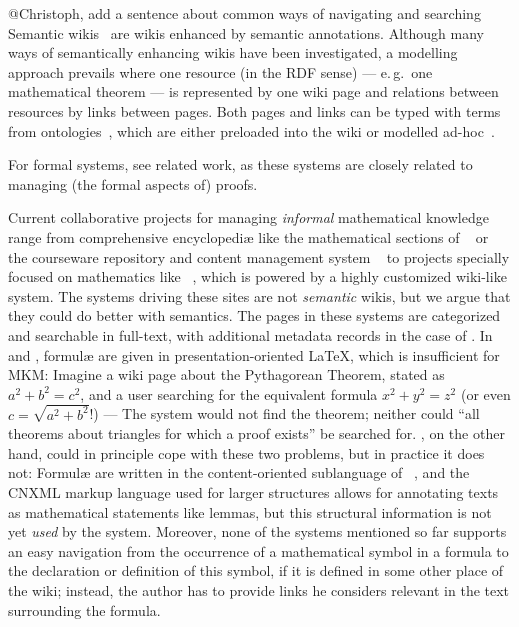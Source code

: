 \documentclass{llncs}
\begin{document}
\begin{todo}{@Christoph, add a sentence about common ways of navigating and searching}
  Semantic wikis~\cite{semwiki06} are wikis enhanced by semantic annotations.  Although
  many ways of semantically enhancing wikis have been investigated, a modelling approach
  prevails where one resource (in the RDF sense) --- e.\,g.\ one
  mathematical theorem --- is represented by one wiki page and relations between resources
  by links between pages.  Both pages and links can be typed with terms from
  ontologies~\cite{OrDeMoVoHa06:annotation-navigation-semwiki}, which are either preloaded
  into the wiki or modelled ad-hoc~\cite{KrSchVr:semwiki-reasoning07}.
\end{todo}

For formal systems, see related work, as these systems are closely related to managing
(the formal aspects of) proofs.

Current collaborative projects for managing \emph{informal} mathematical knowledge range
from comprehensive encyclopediæ like the mathematical sections of
~\cite{wikipedia} or the courseware repository and content management
system ~\cite{CNX:whitepaper} to projects specially focused on
mathematics like ~\cite{krowne03:collaborative-math-libraries}, which
is powered by a highly customized wiki-like system.  The systems driving these sites are
not \emph{semantic} wikis, but we argue that they could do better with semantics.  The
pages in these systems are categorized and searchable in full-text, with additional
metadata records in the case of .  In  and
, formulæ are given in presentation-oriented {\LaTeX}, which is
insufficient for MKM: Imagine a wiki page about the Pythagorean Theorem, stated as $a^2 +
b^2 = c^2$, and a user searching for the equivalent formula $x^2 + y^2 = z^2$ (or even
$c=\sqrt{a^2+b^2}$!) --- The system would not find the theorem; neither could ``all
theorems about triangles for which a proof exists'' be searched for.
, on the other hand, could in principle cope with these two problems,
but in practice it does not: Formulæ are written in the content-oriented sublanguage of
{\mathml}~\cite{CarlisleEd:MathML07}, and the CNXML markup language used for larger
structures allows for annotating texts as mathematical statements like lemmas, but this
structural information is not yet \emph{used} by the system.  Moreover, none of the
systems mentioned so far supports an easy navigation from the occurrence of a mathematical
symbol in a formula to the declaration or definition of this symbol, if it is defined in
some other place of the wiki; instead, the author has to provide links he considers
relevant in the text surrounding the formula.
\end{document}
